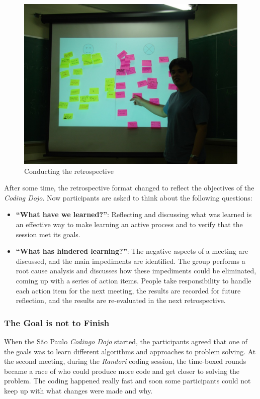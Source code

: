 \begin{figure}[htp]
\centering
\includegraphics[width=\columnwidth]{retrospective}
\caption{Conducting the retrospective}\label{fig:retrospective}
\end{figure}

After some time, the retrospective format changed to reflect the
objectives of the \emph{Coding Dojo}. Now participants are asked to
think about the following questions:

\begin{itemize}
\item \textbf{``What have we learned?''}: Reflecting and discussing
  what was learned is an effective way to make learning an active
  process and to verify that the session met its goals.
\item \textbf{``What has hindered learning?''}: The negative aspects
  of a meeting are discussed, and the main impediments are
  identified. The group performs a root cause analysis and discusses
	how these impediments could be eliminated, coming up
	with a series of action items. People take responsibility
  to handle each action item for the next meeting, the results are
	recorded for future reflection, and the results are re-evaluated in
	the next retrospective.
\end{itemize}

\subsubsection{The Goal is not to Finish}

When the São Paulo \emph{Codingo Dojo} started, the participants
agreed that one of the goals was to learn different algorithms and
approaches to problem solving. At the second meeting, during the
\emph{Randori} coding session, the time-boxed rounds became a race
of who could produce more code and get closer to solving the
problem. The coding happened really fast and soon some participants
could not keep up with what changes were made and why.

